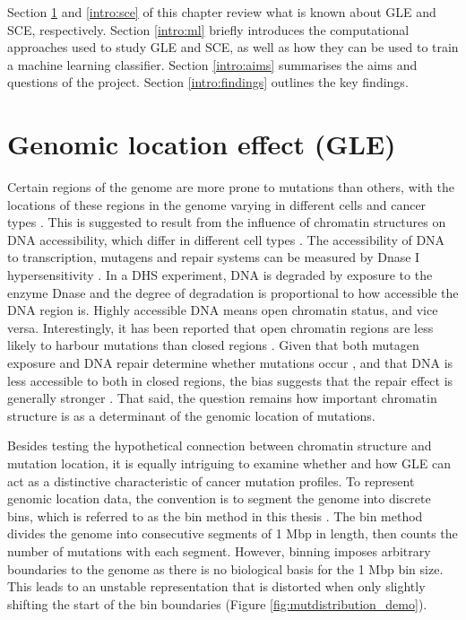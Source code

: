 Section \ref{intro:gle} and \ref{intro:sce} of this chapter review what is known about GLE and SCE, respectively. Section \ref{intro:ml} briefly introduces the computational approaches used to study GLE and SCE, as well as how they can be used to train a machine learning classifier. Section \ref{intro:aims} summarises the aims and questions of the project. Section \ref{intro:findings} outlines the key findings.

\section{Genomic location effect (GLE)}
\label{intro:gle}
Certain regions of the genome are more prone to mutations than others, with the locations of these regions in the genome varying in different cells and cancer types \citep{Polak2015, Jiao2020}. This is suggested to result from the influence of chromatin structures on DNA accessibility, which differ in different cell types \citep{Abascal2020ExpandedGenomes}. The accessibility of DNA to transcription, mutagens and repair systems can be measured by Dnase I hypersensitivity \citep[DHS;][]{Liu2019AApplications}. In a DHS experiment, DNA is degraded by exposure to the enzyme Dnase and the degree of degradation is proportional to how accessible the DNA region is. Highly accessible DNA means open chromatin status, and vice versa. Interestingly, it has been reported that open chromatin regions are less likely to harbour mutations than closed regions \citep{Polak2015,Prendergast2007ChromatinGenome}. Given that both \gls{mutagen} exposure and DNA repair determine whether mutations occur \citep{Ripley2001Mutation}, and that DNA is less accessible to both in closed regions, the bias suggests that the repair effect is generally stronger \citep[Figure \ref{fig:chromatin_demo};][]{Teng1997ExcisionSequences, Morse2002PhotoreactivationCerevisiae}. That said, the question remains how important chromatin structure is as a determinant of the genomic location of mutations. 



Besides testing the hypothetical connection between chromatin structure and mutation location, it is equally intriguing to examine whether and how GLE can act as a distinctive characteristic of cancer mutation profiles. To represent genomic location data, the convention is to segment the genome into discrete bins, which is referred to as the bin method in this thesis \citep{Kubler2019, Salvadores2019PassengerTumors, Chalmers2017AnalysisBurden, Salvadores2020MatchingPatterns}. The bin method divides the genome into consecutive segments of 1 Mbp in length, then counts the number of mutations with each segment. However, binning imposes arbitrary boundaries to the genome as there is no biological basis for the 1 Mbp bin size. This leads to an unstable representation that is distorted when only slightly shifting the start of the bin boundaries (Figure \ref{fig:mutdistribution_demo}). 

